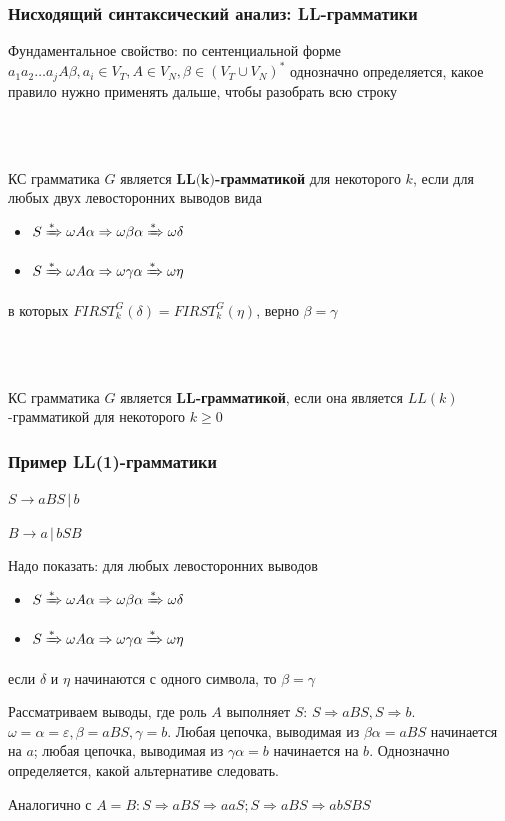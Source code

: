 \documentclass{beamer}
\newcommand{\derive}[0]{\xRightarrow[]{*}}
\begin{document}
\begin{frame}[fragile]
  \transwipe[direction=90]
  \frametitle{Нисходящий синтаксический анализ: LL-грамматики}
    Фундаментальное свойство: по сентенциальной форме $a_1 a_2 \dots a_j A \beta, a_i \in V_T, A \in V_N, \beta \in (V_T \cup V_N)^*$ однозначно определяется, какое правило нужно применять дальше, чтобы разобрать всю строку \pause
    
    ~\\~
      
   КС грамматика $G$ является $\textbf{LL(k)}$\textbf{-грамматикой} для некоторого $k$,  если для любых двух левосторонних выводов вида 
  \begin{itemize}
    \item $S \derive \omega A \alpha \Rightarrow \omega \beta \alpha \derive \omega \delta$
    \item $S \derive \omega A \alpha \Rightarrow \omega \gamma \alpha \derive \omega \eta$
  \end{itemize}
  в которых $FIRST^G_k(\delta) = FIRST ^G_k(\eta)$, верно $\beta = \gamma$

~\\~

  КС грамматика $G$ является $\textbf{LL}$\textbf{-грамматикой}, если она является $LL(k)$-грамматикой для некоторого $k \geq 0$
\end{frame}


\begin{frame}[fragile]
  \transwipe[direction=90]
  \frametitle{Пример LL(1)-грамматики}
  $S \rightarrow a B S \, | \, b$
  
  $B \rightarrow a \, | \, b S B$

  Надо показать: для любых левосторонних выводов
  \begin{itemize}
    \item $S \derive \omega A \alpha \Rightarrow \omega \beta \alpha \derive \omega \delta$
    \item $S \derive \omega A \alpha \Rightarrow \omega \gamma \alpha \derive \omega \eta$
  \end{itemize} 
  если $\delta$ и $\eta$ начинаются с одного символа, то $\beta = \gamma$
  
  Рассматриваем выводы, где роль $A$ выполняет $S$: $S \Rightarrow a B S, S \Rightarrow b$. $\omega = \alpha = \varepsilon, \beta = a B S, \gamma = b$. Любая цепочка, выводимая из $\beta \alpha = a B S$ начинается на $a$; любая цепочка, выводимая из $\gamma \alpha = b$ начинается на $b$. Однозначно определяется, какой альтернативе следовать. 
  
  Аналогично с $A = B: S \Rightarrow a B S \Rightarrow a a S; S \Rightarrow a B S \Rightarrow a b S B S$ 
\end{frame}
\end{document}
